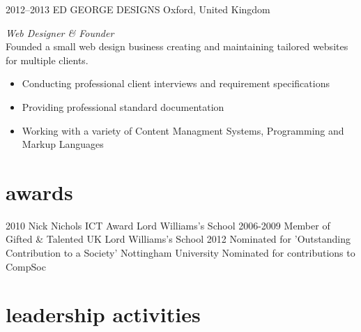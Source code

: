 \documentclass[]{friggeri-cv} %
\begin{document}
\begin{entrylist}
{\begin{itemize}
\end{itemize}}
\entry
{2012--2013}
{ED GEORGE DESIGNS}
{Oxford, United Kingdom}
{\emph{Web Designer \& Founder} \\
Founded a small web design business creating and maintaining tailored websites for multiple clients.
\begin{itemize}
\item Conducting professional client interviews and requirement specifications
\item Providing professional standard documentation
\item Working with a variety of Content Managment Systems, Programming and Markup Languages
\end{itemize}}

\end{entrylist}


\section{awards}

\begin{entrylist}
\entry
{2010}
{Nick Nichols ICT Award}
{Lord Williams's School}
{}
\entry
{2006-2009}
{Member of Gifted \& Talented UK}
{Lord Williams's School}
{}
\entry
{2012}
{Nominated for 'Outstanding Contribution to a Society'}
{Nottingham University}
{Nominated for contributions to CompSoc}
\end{entrylist}


\section{leadership activities}
\end{document}
